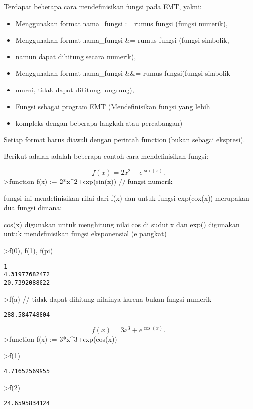 \documentclass[
]{book}
\begin{document}
Terdapat beberapa cara mendefinisikan fungsi pada EMT, yakni:

\begin{itemize}
\item
  Menggunakan format nama\_fungsi := rumus fungsi (fungsi numerik),
\item
  Menggunakan format nama\_fungsi \&= rumus fungsi (fungsi simbolik,
\item
  namun dapat dihitung secara numerik),
\item
  Menggunakan format nama\_fungsi \&\&= rumus fungsi(fungsi simbolik
\item
  murni, tidak dapat dihitung langsung),
\item
  Fungsi sebagai program EMT (Mendefinisikan fungsi yang lebih
\item
  kompleks dengan beberapa langkah atau percabangan)
\end{itemize}

Setiap format harus diawali dengan perintah function (bukan sebagai ekspresi).

Berikut adalah adalah beberapa contoh cara mendefinisikan fungsi:

\[f(x)=2x^2+e^{\sin(x)}.\]\textgreater function f(x) := 2*x\^{}2+exp(sin(x)) // fungsi numerik

fungsi ini mendefinisikan nilai dari f(x) dan untuk fungsi exp(cox(x)) merupakan dua fungsi dimana:

cos(x) digunakan untuk menghitung nilai cos di sudut x dan exp() digunakan untuk mendefinisikan fungsi eksponensial (e pangkat)

\textgreater f(0), f(1), f(pi)

\begin{verbatim}
1
4.31977682472
20.7392088022
\end{verbatim}

\textgreater f(a) // tidak dapat dihitung nilainya karena bukan fungsi numerik

\begin{verbatim}
288.584748804
\end{verbatim}

\[f(x)=3x^3+e^{\cos(x)}.\]\textgreater function f(x) := 3*x\^{}3+exp(cos(x))

\textgreater f(1)

\begin{verbatim}
4.71652569955
\end{verbatim}

\textgreater f(2)

\begin{verbatim}
24.6595834124
\end{verbatim}
\end{document}
